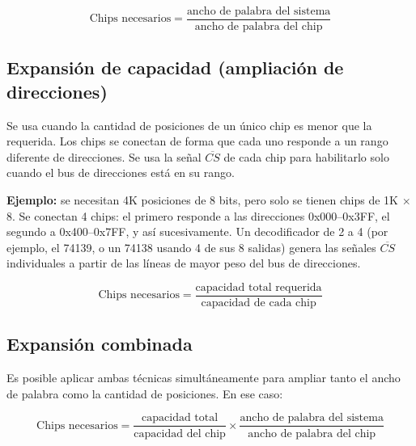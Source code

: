 $$\text{Chips necesarios} = \frac{\text{ancho de palabra del sistema}}{\text{ancho de palabra del chip}}$$

\subsection{Expansión de capacidad (ampliación de direcciones)}

Se usa cuando la cantidad de posiciones de un único chip es menor que la requerida. Los chips se conectan de forma que cada uno responde a un rango diferente de direcciones. Se usa la señal $\overline{CS}$ de cada chip para habilitarlo solo cuando el bus de direcciones está en su rango.

\textbf{Ejemplo:} se necesitan 4K posiciones de 8 bits, pero solo se tienen chips de 1K $\times$ 8. Se conectan 4 chips: el primero responde a las direcciones 0x000--0x3FF, el segundo a 0x400--0x7FF, y así sucesivamente. Un decodificador de 2 a 4 (por ejemplo, el 74139, o un 74138 usando 4 de sus 8 salidas) genera las señales $\overline{CS}$ individuales a partir de las líneas de mayor peso del bus de direcciones.


$$\text{Chips necesarios} = \frac{\text{capacidad total requerida}}{\text{capacidad de cada chip}}$$

\subsection{Expansión combinada}

Es posible aplicar ambas técnicas simultáneamente para ampliar tanto el ancho de palabra como la cantidad de posiciones. En ese caso:

$$\text{Chips necesarios} = \frac{\text{capacidad total}}{\text{capacidad del chip}} \times \frac{\text{ancho de palabra del sistema}}{\text{ancho de palabra del chip}}$$
